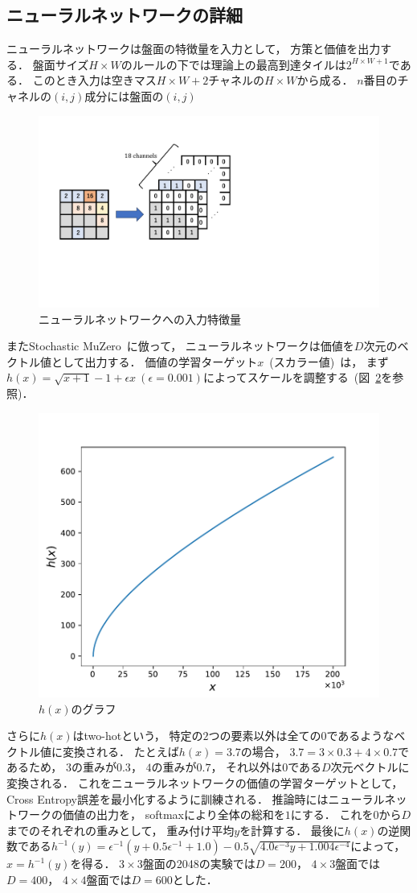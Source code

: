 \subsection{ニューラルネットワークの詳細}
\label{subsec:nn_impl}
ニューラルネットワークは盤面の特徴量を入力として， 方策と価値を出力する．
盤面サイズ$H \times W$のルールの下では理論上の最高到達タイルは$2^{H \times W + 1}$である．
このとき入力は空きマス$H \times W + 2$チャネルの$H \times W$から成る．
$n$番目のチャネルの$(i,j)$成分には盤面の$(i,j)$
\begin{figure}[t]
    \centering
    \includegraphics[width=0.6\linewidth{}]{figures/encoding.pdf}
    \caption{ニューラルネットワークへの入力特徴量}
    \label{fig:input_encoding}
\end{figure}

またStochastic MuZero~\cite{StochasticMuZero}に倣って， ニューラルネットワークは価値を$D$次元のベクトル値として出力する．
価値の学習ターゲット$x$~(スカラー値)~は， まず$h(x)= \sqrt{x+1} - 1 + \epsilon x \ (\epsilon=0.001)$によってスケールを調整する~(図~\ref{fig:transform}を参照)．
\begin{figure}[t]
    \centering
    \includegraphics[width=0.6\linewidth{}]{figures/transform_.pdf}
    \caption{$h(x)$のグラフ}
    \label{fig:transform}
\end{figure}
さらに$h(x)$はtwo-hotという， 特定の$2$つの要素以外は全ての$0$であるようなベクトル値に変換される．
たとえば$h(x)=3.7$の場合， $3.7=3 \times 0.3 + 4 \times 0.7$であるため， $3$の重みが$0.3$， $4$の重みが$0.7$， それ以外は$0$である$D$次元ベクトルに変換される．
これをニューラルネットワークの価値の学習ターゲットとして， Cross Entropy誤差を最小化するように訓練される．
推論時にはニューラルネットワークの価値の出力を， softmaxにより全体の総和を$1$にする．
これを$0$から$D$までのそれぞれの重みとして， 重み付け平均$y$を計算する．
最後に$h(x)$の逆関数である$h^{-1}(y)= \epsilon^{-1} (y + 0.5\epsilon^{-1} + 1.0) - 0.5 \sqrt{4.0 \epsilon^{-3} y + 1.004 \epsilon^{-4}}$によって， $x=h^{-1}(y)$を得る．
$3\times3$盤面の2048の実験では$D=200$， $4\times3$盤面では$D=400$， $4\times4$盤面では$D=600$とした．

